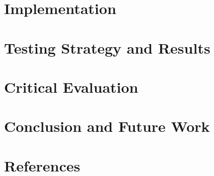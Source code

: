 \documentclass[12pt,a4paper]{report}
\begin{document}
	\chapter{Implementation}
	
	
	\chapter{Testing Strategy and Results}
	
	
	\chapter{Critical Evaluation}
	\chapter{Conclusion and Future Work}
	\chapter{References}
	
\end{document}
